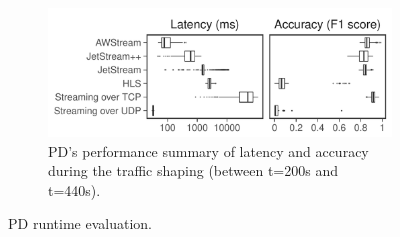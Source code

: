 \documentclass[twocolumn, 9pt]{article}
\begin{document}
\begin{figure}[ht]
\begin{subfigure}[t]{\columnwidth}
    \centering
    \includegraphics[width=\columnwidth]{figures/runtime_mot-boxplot.pdf}
    \caption{PD's performance summary of latency and accuracy during the traffic
      shaping (between t=200s and t=440s).}
    \label{fig:pd-runtime-boxplot}
  \end{subfigure}
  \caption{PD runtime evaluation.}
  \label{fig:pd-runtime}
\end{figure}
\end{document}
